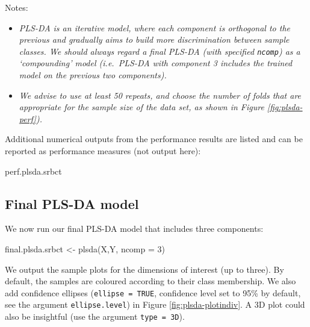 \documentclass[
]{book}
\newenvironment{Shaded}{\begin{snugshade}}{\end{snugshade}}
\newcommand{\AttributeTok}[1]{\textcolor[rgb]{0.77,0.63,0.00}{#1}}
\newcommand{\DecValTok}[1]{\textcolor[rgb]{0.00,0.00,0.81}{#1}}
\newcommand{\FunctionTok}[1]{\textcolor[rgb]{0.00,0.00,0.00}{#1}}
\newcommand{\NormalTok}[1]{#1}
\newcommand{\OtherTok}[1]{\textcolor[rgb]{0.56,0.35,0.01}{#1}}
\providecommand{\tightlist}{%
  \setlength{\itemsep}{0pt}\setlength{\parskip}{0pt}}
\begin{document}
Notes:

\begin{itemize}
\tightlist
\item
  \emph{PLS-DA is an iterative model, where each component is orthogonal to the previous and gradually aims to build more discrimination between sample classes. We should always regard a final PLS-DA (with specified \texttt{ncomp}) as a `compounding' model (i.e.~PLS-DA with component 3 includes the trained model on the previous two components).}
\item
  \emph{We advise to use at least 50 repeats, and choose the number of folds that are appropriate for the sample size of the data set, as shown in Figure \ref{fig:plsda-perf}).}
\end{itemize}

Additional numerical outputs from the performance results are listed and can be reported as performance measures (not output here):

\begin{Shaded}
\begin{Highlighting}[]
\NormalTok{perf.plsda.srbct}
\end{Highlighting}
\end{Shaded}

\hypertarget{PLSDA:final:perf}{%
\subsection{Final PLS-DA model}\label{PLSDA:final:perf}}

We now run our final PLS-DA model that includes three components:

\begin{Shaded}
\begin{Highlighting}[]
\NormalTok{final.plsda.srbct }\OtherTok{\textless{}{-}} \FunctionTok{plsda}\NormalTok{(X,Y, }\AttributeTok{ncomp =} \DecValTok{3}\NormalTok{)}
\end{Highlighting}
\end{Shaded}

We output the sample plots for the dimensions of interest (up to three). By default, the samples are coloured according to their class membership. We also add confidence ellipses (\texttt{ellipse\ =\ TRUE}, confidence level set to 95\% by default, see the argument \texttt{ellipse.level}) in Figure \ref{fig:plsda-plotindiv}. A 3D plot could also be insightful (use the argument \texttt{type\ =\ \textquotesingle{}3D\textquotesingle{}}).
\end{document}
